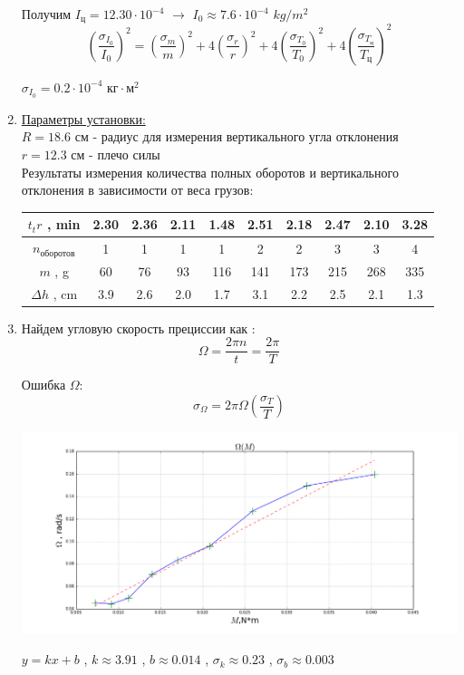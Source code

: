 \documentclass[8pt]{article}
\begin{document}
\begin{enumerate}
    Получим $I_{\text{ц}}=12.30 \cdot 10^{-4}$ $\rightarrow$ $I_{0} \approx 7.6 \cdot 10^{-4}$  $kg/m^2$  \\
    $$\left(\frac{\sigma_{I_0}}{I_0}\right)^2 
    = \left(\frac{\sigma_{m}}{m}\right)^2
    + 4\left(\frac{\sigma_{r}}{r}\right)^2
    + 4\left(\frac{\sigma_{T_0}}{T_0}\right)^2
    + 4\left(\frac{\sigma_{T_\text{ц}}}{T_\text{ц}}\right)^2$$
    
    $\sigma_{I_0} = 0.2 \cdot 10^{-4} \text{ кг}\cdot\text{м}^2$
    \item
    \underline{Параметры установки:} \\ 
        $R = 18.6$ см - радиус для измерения вертикального угла отклонения \\
        $r = 12.3$ см - плечо силы \\

        Результаты измерения количества полных оборотов и вертикального отклонения в зависимости от веса грузов:
                    \begin{center}
                    \begin{tabular}{|c|c|c|c|c|c|c|c|c|c|}
                        \hline
                            $t_tr$ , min & 2.30 & 2.36 & 2.11 & 1.48 & 2.51 & 2.18 & 2.47 & 2.10 & 3.28 \\
                            \hline
                            $n_\text{оборотов}$ & 1 &1 &1 &1&2&2&3&3&4 \\
                            \hline
                            $m$ , g  & 60 &76&93&116&141&173&215&268&335 \\
                            \hline
                            $\Delta h$ , cm & 3.9& 2.6& 2.0& 1.7& 3.1& 2.2& 2.5& 2.1& 1.3 \\
                            \hline
                    \end{tabular}
                    \end{center}
    \item Найдем угловую скорость прециссии как :
    $$\Omega = \frac{2\pi n}{t} = \frac{2\pi}{T}$$
    
    Ошибка $\Omega$:
    $$ \sigma_{\Omega} = 2 \pi \Omega \left(\frac{\sigma_{T}}{T}\right)$$

    \begin{center} 
        \includegraphics[width=6.5in]{graph.png} 

        $y = kx + b$ , $k \approx 3.91$  , $b \approx 0.014$ , $\sigma_k \approx 0.23$ , $\sigma_b \approx 0.003$\\
    \end{center}

    
    \end{enumerate}
\end{document}

